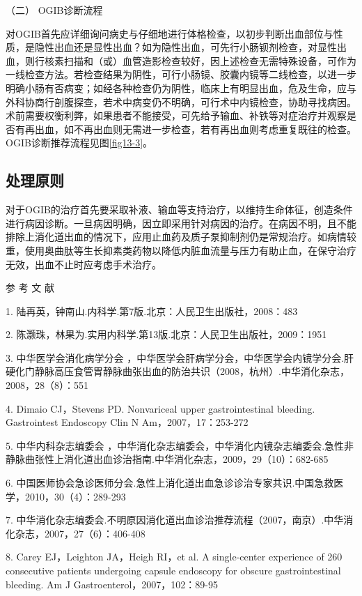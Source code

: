 \hypertarget{text00034.htmlux5cux23CHP1-13-3-1-2}{}
（二） OGIB诊断流程

对OGIB首先应详细询问病史与仔细地进行体格检查，以初步判断出血部位与性质，是隐性出血还是显性出血？如为隐性出血，可先行小肠钡剂检查，对显性出血，则行核素扫描和（或）血管造影检查较好，因上述检查无需特殊设备，可作为一线检查方法。若检查结果为阴性，可行小肠镜、胶囊内镜等二线检查，以进一步明确小肠有否病变；如经各种检查仍为阴性，临床上有明显出血，危及生命，应与外科协商行剖腹探查，若术中病变仍不明确，可行术中内镜检查，协助寻找病因。术前需要权衡利弊，如果患者不能接受，可先给予输血、补铁等对症治疗并观察是否有再出血，如不再出血则无需进一步检查，若有再出血则考虑重复既往的检查。OGIB诊断推荐流程见图\ref{fig13-3}。

\subsection{处理原则}

对于OGIB的治疗首先要采取补液、输血等支持治疗，以维持生命体征，创造条件进行病因诊断。一旦病因明确，因立即采用针对病因的治疗。在病因不明，且不能排除上消化道出血的情况下，应用止血药及质子泵抑制剂仍是常规治疗。如病情较重，使用奥曲肽等生长抑素类药物以降低内脏血流量与压力有助止血，在保守治疗无效，出血不止时应考虑手术治疗。

\protect\hypertarget{text00035.html}{}{}

\hypertarget{text00035.htmlux5cux23CHP1-13-4}{}
参 考 文 献

1. 陆再英，钟南山.内科学.第7版.北京：人民卫生出版社，2008：483

2. 陈灏珠，林果为.实用内科学.第13版.北京：人民卫生出版社，2009：1951

3. 中华医学会消化病学分会
，中华医学会肝病学分会，中华医学会内镜学分会.肝硬化门静脉高压食管胃静脉曲张出血的防治共识（2008，杭州）.中华消化杂志，2008，28（8）：551

4. Dimaio CJ，Stevens PD. Nonvariceal upper gastrointestinal bleeding.
Gastrointest Endoscopy Clin N Am，2007，17：253-272

5. 中华内科杂志编委会
，中华消化杂志编委会，中华消化内镜杂志编委会.急性非静脉曲张性上消化道出血诊治指南.中华消化杂志，2009，29（10）：682-685

6.
中国医师协会急诊医师分会.急性上消化道出血急诊诊治专家共识.中国急救医学，2010，30（4）：289-293

7.
中华消化杂志编委会.不明原因消化道出血诊治推荐流程（2007，南京）.中华消化杂志，2007，27（6）：406-408

8. Carey EJ，Leighton JA，Heigh RI，et al. A single-center experience of
260 consecutive patients undergoing capsule endoscopy for obscure
gastrointestinal bleeding. Am J Gastroenterol，2007，102：89-95

